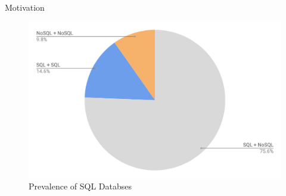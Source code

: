 \documentclass[handout, xcolor={dvipsnames}]{beamer}
\begin{document}
\begin{frame}{Motivation}{}
\begin{itemize}
{\begin{itemize}
\begin{figure}
           \includegraphics[scale = 0.1]{SQL_usage.png}
           \caption{Prevalence of SQL Databses}
           \label{fig:sql_prev}
       \end{figure}
   \end{itemize}
  }

  \end{itemize}
\end{frame}
\end{document}
